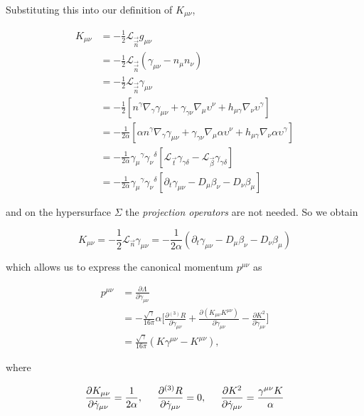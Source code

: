 Substituting this into our definition of $K_{\mu\nu}$,

\begin{align}
K_{\mu\nu} &= -\frac{1}{2}\mathcal{L}_{\vec{\vec{n}}}g_{\mu\nu} \\
&= -\frac{1}{2}\mathcal{L}_{\vec{\vec{n}}}(\gamma_{\mu\nu}-n_{\mu}n_{\nu}) \\
&= -\frac{1}{2}\mathcal{L}_{\vec{\vec{n}}}\gamma_{\mu\nu} \\
&= -\frac{1}{2}[n^{\gamma}\nabla_{\gamma}\gamma_{\mu\nu} + \gamma_{\gamma\nu}\nabla_{\mu}\upsilon^{\nu} + h_{\mu\gamma}\nabla_{\nu}\upsilon^{\gamma}] \\
&= -\frac{1}{2\alpha}[\alpha n^{\gamma}\nabla_{\gamma}\gamma_{\mu\nu} + \gamma_{\gamma\nu}\nabla_{\mu}\alpha\upsilon^{\nu} + h_{\mu\gamma}\nabla_{\nu}\alpha\upsilon^{\gamma}] \\
&= -\frac{1}{2\alpha}{\gamma_{\mu}}^{\gamma}{\gamma_{\nu}}^{\delta}[\mathcal{L}_{\vec{t}}\gamma_{\gamma\delta}-\mathcal{L}_{\vec{\beta}}\gamma_{\gamma\delta}] \\
&= -\frac{1}{2\alpha}{\gamma_{\mu}}^{\gamma}{\gamma_{\nu}}^{\delta}[\partial_t\gamma_{\mu\nu}-D_{\mu}\beta_{\nu}-D_{\nu}\beta_{\mu}]
\end{align}

and on the hypersurface $\Sigma$ the \textit{projection operators} are not needed. So we obtain

\begin{equation}
K_{\mu\nu} = -\frac{1}{2}\mathcal{L}_{\vec{n}}\gamma_{\mu\nu}=-\frac{1}{2\alpha}(\partial_t\gamma_{\mu\nu}-D_{\mu}\beta_{\nu}-D_{\nu}\beta_{\mu})
\end{equation}

which allows us to express the canonical momentum $p^{\mu\nu}$ as

\begin{align}
p^{\mu\nu} &= \frac{\partial\Lambda}{\partial\dot{\gamma}_{\mu\nu}} \\
&= -\frac{\sqrt{\gamma}}{16\pi}\alpha\Bigg[\frac{\partial {^{(3)}R}}{\partial\dot{\gamma}_{\mu\nu}} + \frac{\partial(K_{\mu\nu}K^{\mu\nu})}{\partial\dot{\gamma}_{\mu\nu}} - \frac{\partial K^2}{\partial\dot{\gamma}_{\mu\nu}}\Bigg] \\
&= \frac{\sqrt{\gamma}}{16\pi}(K\gamma^{\mu\nu} - K^{\mu\nu}),
\end{align}

where 

\begin{equation}
\frac{\partial K_{\mu\nu}}{\partial \dot{\gamma}_{\mu\nu}} = \frac{1}{2\alpha}, \hspace{5mm} \frac{\partial {^{(3)}R}}{\partial \dot{\gamma}_{\mu\nu}} = 0, \hspace{5mm}\frac{\partial K^2}{\partial \dot{\gamma}_{\mu\nu}} = \frac{\gamma^{\mu\nu}K}{\alpha}
\end{equation}

